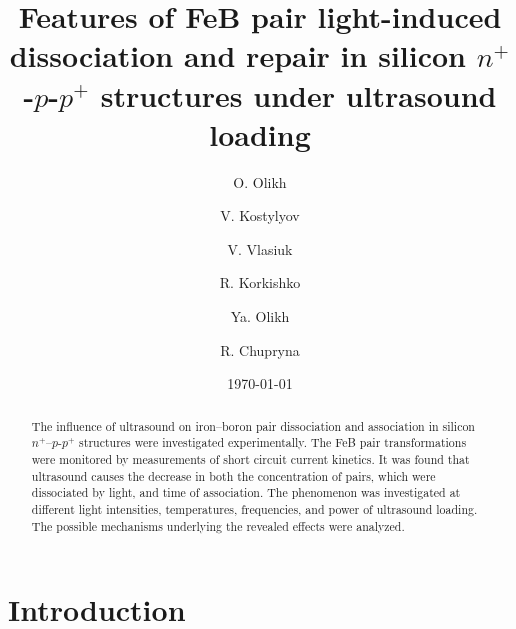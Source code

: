 \documentclass[%
 aip,jap,
 amsmath,amssymb,
 reprint,%
]{revtex4-1}
\begin{document}

\title[FeB transformations under ultrasound loading]{Features of FeB pair light-induced dissociation and repair in silicon $n^+$-$p$-$p^+$ structures under ultrasound loading}
\author{O. Olikh}
\author{V. Kostylyov}%
\author{V. Vlasiuk}
\author{R. Korkishko}
\author{Ya. Olikh}
%

\author{R. Chupryna}


\date{\today}%

\begin{abstract}
The influence of ultrasound on iron--boron pair dissociation and association in silicon $n^+$–$p$-$p^+$ structures were investigated experimentally.
The FeB pair transformations were monitored by measurements of  short circuit current kinetics.
It was found that ultrasound causes the decrease in both the concentration of pairs, which were dissociated by light, and time of association.
The phenomenon was investigated at different light intensities, temperatures, frequencies, and power of ultrasound loading.
The possible mechanisms underlying the revealed  effects were analyzed.
\end{abstract}

\maketitle


\section{\label{sec:Int}Introduction}
\end{document}
